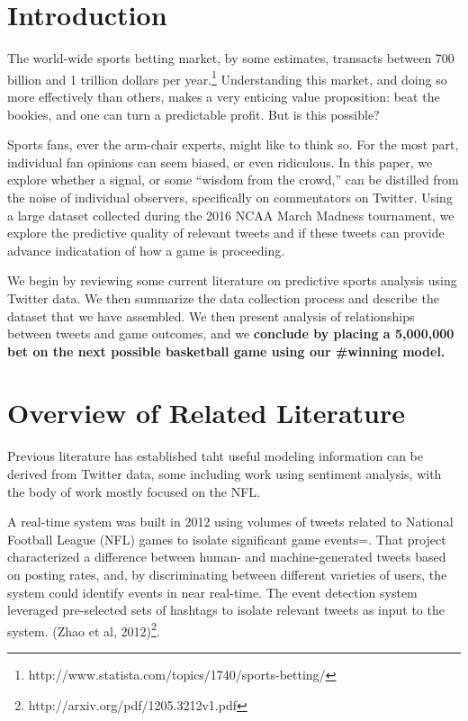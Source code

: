 \documentclass[12pt]{article}
\begin{document}
\tableofcontents
\newpage
\begin{doublespacing}

\section{Introduction}

The world-wide sports betting market, by some estimates, transacts between 700 billion and 1 trillion dollars per year.\footnote{http://www.statista.com/topics/1740/sports-betting/}
Understanding this market, and doing so more effectively
than others, makes a very enticing value proposition:
beat the bookies, and one can turn a predictable profit. But is this possible? 

Sports fans, ever the arm-chair experts, might like to think so.
For the most part, individual fan opinions can seem biased, or even ridiculous.
In this paper, we explore whether a signal, or some ``wisdom from the crowd,'' can be distilled
from the noise of individual observers, specifically on commentators on Twitter. Using
a large dataset collected during the 2016 NCAA March Madness tournament, 
we explore the predictive quality of relevant tweets and if these tweets can provide advance
indicatation of how a game is proceeding.

We begin by reviewing some current literature on predictive sports analysis using Twitter data.
We then summarize the data collection process and describe the dataset that we have assembled. 
We then present analysis of relationships between tweets and game outcomes, and we {\bf conclude
by placing a 5,000,000 bet on the next possible basketball game using our \#winning model.}

\section{Overview of Related Literature}

Previous literature has established taht useful modeling information can be
derived from Twitter data, some including work using sentiment analysis, with the body of work mostly focused on the NFL. 

A real-time system was built in 2012 using volumes of 
tweets related to National Football League (NFL) games to 
isolate significant game
events=. That project characterized a 
difference between human- and machine-generated tweets
based on posting rates, and, by discriminating between 
different varieties of users, the system could 
identify events in near real-time. The event detection
system leveraged pre-selected sets of hashtags
to isolate relevant tweets as input to the system. (Zhao et al, 
2012)\footnote{http://arxiv.org/pdf/1205.3212v1.pdf}. 


\end{doublespacing}
\end{document}
